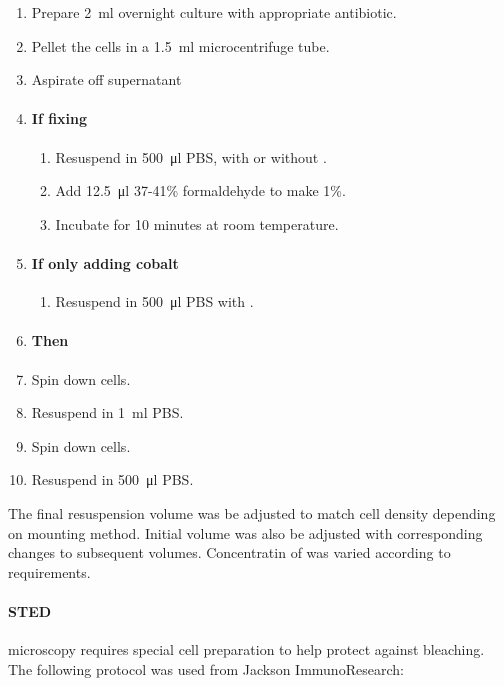 \documentclass[../main.tex]{subfiles}
\begin{document}
\begin{enumerate}
\item Prepare \SI{2}{\milli\litre} overnight culture with appropriate antibiotic.
\item Pellet the cells in a \SI{1.5}{\milli\litre} microcentrifuge tube.
\item Aspirate off supernatant
\item \paragraph{If fixing}
\begin{enumerate}
\item Resuspend in \SI{500}{\micro\litre} PBS, with or without .
\item Add \SI{12.5}{\micro\litre} 37-41\% formaldehyde to make 1\%.
\item Incubate for 10 minutes at room temperature.
\end{enumerate}
\item \paragraph{If only adding cobalt}
\begin{enumerate}
\item Resuspend in \SI{500}{\micro\litre} PBS with .
\end{enumerate}
\item[] \paragraph{Then}
\item Spin down cells.
\item Resuspend in \SI{1}{\milli\litre} PBS.
\item Spin down cells.
\item Resuspend in \SI{500}{\micro\litre} PBS.
\end{enumerate}

The final resuspension volume was be adjusted to match cell density depending on mounting method. Initial volume was also be adjusted with corresponding changes to subsequent volumes. Concentratin of  was varied according to requirements.

\paragraph{STED} microscopy requires special cell preparation to help protect against bleaching. The following protocol was used from Jackson ImmunoResearch\citep{jackson}:
\end{document}
